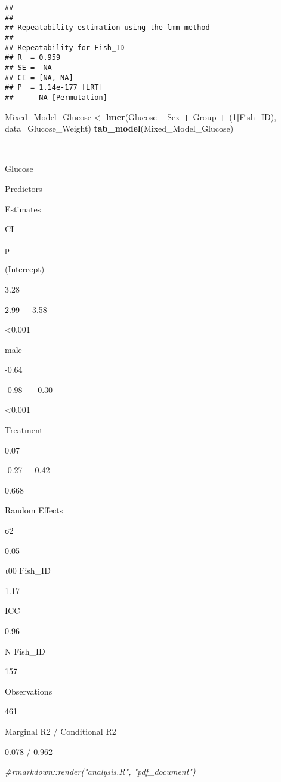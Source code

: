 \documentclass[]{article}
\newenvironment{Shaded}{\begin{snugshade}}{\end{snugshade}}
\newcommand{\KeywordTok}[1]{\textcolor[rgb]{0.13,0.29,0.53}{\textbf{#1}}}
\newcommand{\DataTypeTok}[1]{\textcolor[rgb]{0.13,0.29,0.53}{#1}}
\newcommand{\DecValTok}[1]{\textcolor[rgb]{0.00,0.00,0.81}{#1}}
\newcommand{\StringTok}[1]{\textcolor[rgb]{0.31,0.60,0.02}{#1}}
\newcommand{\CommentTok}[1]{\textcolor[rgb]{0.56,0.35,0.01}{\textit{#1}}}
\newcommand{\OperatorTok}[1]{\textcolor[rgb]{0.81,0.36,0.00}{\textbf{#1}}}
\newcommand{\NormalTok}[1]{#1}
\begin{document}
\begin{verbatim}
## 
## 
## Repeatability estimation using the lmm method 
## 
## Repeatability for Fish_ID
## R  = 0.959
## SE =  NA 
## CI = [NA, NA]
## P  = 1.14e-177 [LRT]
##      NA [Permutation]
\end{verbatim}

\begin{Shaded}
\begin{Highlighting}[]
\NormalTok{Mixed_Model_Glucose <-}\StringTok{ }\KeywordTok{lmer}\NormalTok{(Glucose }\OperatorTok{~}\StringTok{ }\NormalTok{Sex }\OperatorTok{+}\StringTok{ }\NormalTok{Group }\OperatorTok{+}\StringTok{ }\NormalTok{(}\DecValTok{1}\OperatorTok{|}\NormalTok{Fish_ID), }\DataTypeTok{data=}\NormalTok{Glucose_Weight)}
\KeywordTok{tab_model}\NormalTok{(Mixed_Model_Glucose)}
\end{Highlighting}
\end{Shaded}

~

Glucose

Predictors

Estimates

CI

p

(Intercept)

3.28

2.99~--~3.58

\textless{}0.001

male

-0.64

-0.98~--~-0.30

\textless{}0.001

Treatment

0.07

-0.27~--~0.42

0.668

Random Effects

σ2

0.05

τ00 Fish\_ID

1.17

ICC

0.96

N Fish\_ID

157

Observations

461

Marginal R2 / Conditional R2

0.078 / 0.962

\begin{Shaded}
\begin{Highlighting}[]
\CommentTok{#rmarkdown::render("analysis.R", "pdf_document")}
\end{Highlighting}
\end{Shaded}
\end{document}
